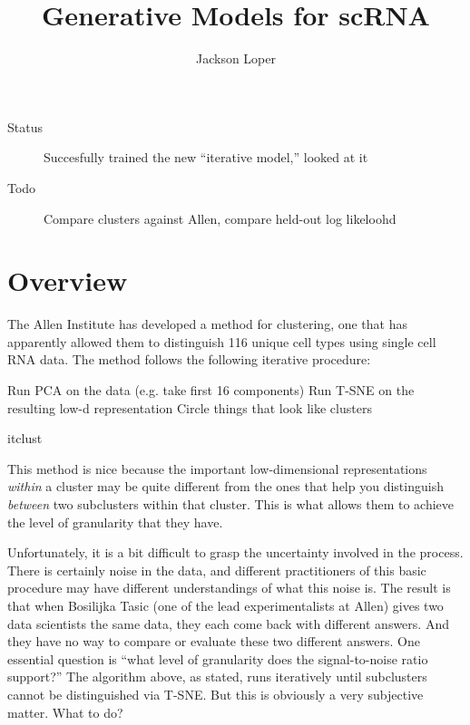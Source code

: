 



\DeclareMathOperator*{\Categorical}{Categorical}


\title{Generative Models for scRNA}
\author{Jackson Loper}

\usepackage{amsthm}
\newtheorem{thm}{Theorem}
\newtheorem{conj}{Conjecture}


\maketitle

\begin{description}
  \item[Status] Succesfully trained the new ``iterative model,'' looked at it
  \item[Todo] Compare clusters against Allen, compare held-out log likeloohd
\end{description}

\section{Overview}

The Allen Institute has developed a method for clustering, one that has apparently allowed them to distinguish 116 unique cell types using single cell RNA data.  The method follows the following iterative procedure:

\begin{algorithm}[H]
 \vspace{.1in}
  Run PCA on the data (e.g. take first 16 components)\;
  Run T-SNE on the resulting low-d representation\;
  Circle things that look like clusters\;
 \caption{itclust}
\end{algorithm}

This method is nice because the important low-dimensional representations \emph{within} a cluster may be quite different from the ones that help you distinguish \emph{between} two subclusters within that cluster.  This is what allows them to achieve the level of granularity that they have. 

Unfortunately, it is a bit difficult to grasp the uncertainty involved in the process.  There is certainly noise in the data, and different practitioners of this basic procedure may have different understandings of what this noise is.  The result is that when Bosilijka Tasic (one of the lead experimentalists at Allen) gives two data scientists the same data, they each come back with different answers.  And they have no way to compare or evaluate these two different answers.  One essential question is ``what level of granularity does the signal-to-noise ratio support?''  The algorithm above, as stated, runs iteratively until subclusters cannot be distinguished via T-SNE.  But this is obviously a very subjective matter.  What to do?

